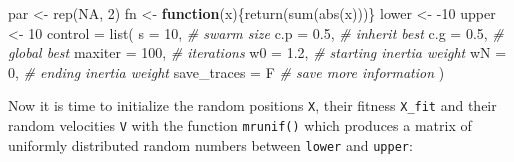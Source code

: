 \documentclass[
  oneside]{book}
\newenvironment{Shaded}{\begin{snugshade}}{\end{snugshade}}
\newcommand{\AttributeTok}[1]{\textcolor[rgb]{0.77,0.63,0.00}{#1}}
\newcommand{\CommentTok}[1]{\textcolor[rgb]{0.56,0.35,0.01}{\textit{#1}}}
\newcommand{\ConstantTok}[1]{\textcolor[rgb]{0.00,0.00,0.00}{#1}}
\newcommand{\ControlFlowTok}[1]{\textcolor[rgb]{0.13,0.29,0.53}{\textbf{#1}}}
\newcommand{\DecValTok}[1]{\textcolor[rgb]{0.00,0.00,0.81}{#1}}
\newcommand{\FloatTok}[1]{\textcolor[rgb]{0.00,0.00,0.81}{#1}}
\newcommand{\FunctionTok}[1]{\textcolor[rgb]{0.00,0.00,0.00}{#1}}
\newcommand{\NormalTok}[1]{#1}
\newcommand{\OtherTok}[1]{\textcolor[rgb]{0.56,0.35,0.01}{#1}}
\newcommand{\SpecialCharTok}[1]{\textcolor[rgb]{0.00,0.00,0.00}{#1}}
\begin{document}
\begin{Shaded}
\begin{Highlighting}[]
\NormalTok{par }\OtherTok{\textless{}{-}} \FunctionTok{rep}\NormalTok{(}\ConstantTok{NA}\NormalTok{, }\DecValTok{2}\NormalTok{)}
\NormalTok{fn }\OtherTok{\textless{}{-}} \ControlFlowTok{function}\NormalTok{(x)\{}\FunctionTok{return}\NormalTok{(}\FunctionTok{sum}\NormalTok{(}\FunctionTok{abs}\NormalTok{(x)))\}}
\NormalTok{lower }\OtherTok{\textless{}{-}} \SpecialCharTok{{-}}\DecValTok{10}
\NormalTok{upper }\OtherTok{\textless{}{-}} \DecValTok{10}
\NormalTok{control }\OtherTok{=} \FunctionTok{list}\NormalTok{(}
  \AttributeTok{s =} \DecValTok{10}\NormalTok{, }\CommentTok{\# swarm size}
  \AttributeTok{c.p =} \FloatTok{0.5}\NormalTok{, }\CommentTok{\# inherit best}
  \AttributeTok{c.g =} \FloatTok{0.5}\NormalTok{, }\CommentTok{\# global best}
  \AttributeTok{maxiter =} \DecValTok{100}\NormalTok{, }\CommentTok{\# iterations}
  \AttributeTok{w0 =} \FloatTok{1.2}\NormalTok{, }\CommentTok{\# starting inertia weight}
  \AttributeTok{wN =} \DecValTok{0}\NormalTok{, }\CommentTok{\# ending inertia weight}
  \AttributeTok{save\_traces =}\NormalTok{ F }\CommentTok{\# save more information}
\NormalTok{)}
\end{Highlighting}
\end{Shaded}

Now it is time to initialize the random positions \texttt{X}, their fitness \texttt{X\_fit} and their random velocities \texttt{V} with the function \texttt{mrunif()} which produces a matrix of uniformly distributed random numbers between \texttt{lower} and \texttt{upper}:

\begin{Shaded}
\end{Shaded}
\end{document}

